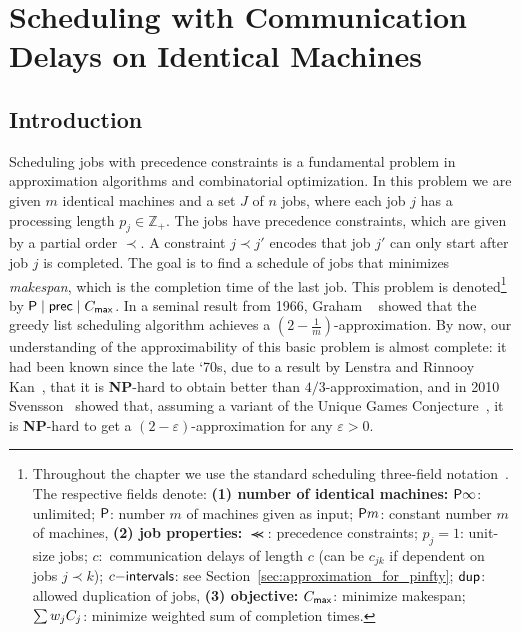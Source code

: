 \chapter{Scheduling with Communication Delays on Identical Machines}\label{chapter: S1}
\section{Introduction}

Scheduling jobs with precedence constraints is a fundamental problem in approximation algorithms and combinatorial optimization.
In this problem we are given $m$ identical  machines and a set  $J$ of $n$ jobs, where each job $j$ has a processing length $p_j  \in \mathbb{Z}_+$.
The jobs have precedence constraints, which are given by a partial order $\prec$. 
A constraint $j \prec j'$ encodes that job $j'$ can only start after job $j$ is completed.
The goal is to find a schedule of jobs that minimizes {\em makespan}, which is the completion time of the last job.
This problem is denoted\footnote{
	Throughout the chapter we use the standard scheduling three-field notation~\cite{GLLR79,VeltmanLL90}.
	The respective fields
	denote:
	\textbf{(1)
	number of identical machines:} $\mathsf{P} \infty$: unlimited; $\mathsf{P}$: number $m$ of machines given as input; $\mathsf{P} m$: constant number $m$ of machines,
	\textbf{(2) job properties:} $\Prec$: precedence constraints; $p_j=1$: unit-size jobs; $c$:~communication delays of length $c$ (can be $c_{jk}$ if dependent on jobs $j \prec k$); $c\mathsf{-intervals}$: see Section~\ref{sec:approximation_for_pinfty}; $\mathsf{dup}$: allowed duplication of jobs,
	\textbf{(3) objective:} $C_{\mathsf{max}}$: minimize makespan; $\sum w_j C_j$: minimize weighted sum of completion times.
}
by $\mathsf{P} \mid \mathsf{prec} \mid C_{\mathsf{max}}$.
In a seminal result from 1966, Graham ~\cite{GrahamListScheduling1966} showed that the greedy list scheduling algorithm achieves a $\left(2- \frac{1}{m}\right)$-approximation. 
By now, our understanding of the approximability of this basic problem is almost complete: 
it had been known since the late `70s, due to a result by Lenstra and Rinnooy Kan~\cite{LR78}, that it is \textbf{NP}-hard to obtain better than $4/3$-approximation, and in 2010 Svensson~\cite{Svensson10} showed that, assuming a variant of the Unique Games Conjecture~\cite{BansalK10}, it is \textbf{NP}-hard to get a $(2-\varepsilon)$-approximation for any $\varepsilon > 0$.

